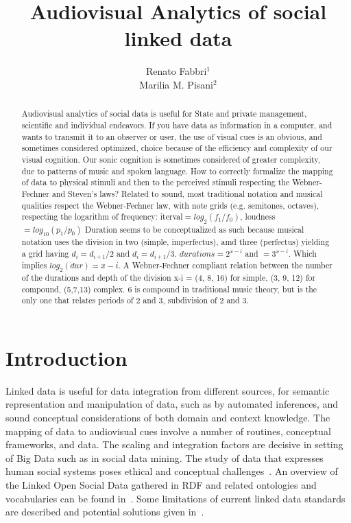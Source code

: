 \documentclass[letterpaper,10pt]{article}
\begin{document}
\title{Audiovisual Analytics of social linked data}

\author{Renato Fabbri$^1$\\
	Marilia M. Pisani$^2$
}
\address{$^1$IFSC/USP, $^2$CCNH/UFABC}

\begin{abstract}
	Audiovisual analytics of social data is useful for State and private
	management, scientific and individual endeavors.
	If you have data as information in a computer, and wants to
	transmit it to an observer or user, the use of visual cues is an obvious,
	and sometimes considered optimized, choice because of the efficiency and
	complexity of our visual cognition.
	Our sonic cognition is sometimes considered of greater complexity,
	due to patterns of music and spoken language.
	How to correctly formalize the mapping of data to physical stimuli
	and then to the perceived stimuli
	respecting the Webner-Fechner and Steven's laws?
	Related to sound, most traditional notation and musical qualities
	respect the Webner-Fechner law, with note grids (e.g. semitones, octaves),
	respecting the logarithm of frequency: iterval$=log_2(f_1/f_0)$,
	loudness$=log_10(p_1/p_0)$
	Duration seems to be conceptualized as such
	because musical notation uses the division in two (simple, imperfectus),
	amd three (perfectus) yielding a grid having
	$d_i=d_{i+1}/2$ and $d_i=d_{i+1}/3$.
	$durations=2^{x-i}$ and $=3^{x-i}$.
	Which implies $log_2(dur) = x-i$.
	A Webner-Fechner compliant relation
	between the number of the durations and
	depth of the division x-i = (4, 8, 16) for simple,
	(3, 9, 12) for compound,
	(5,7,13) complex.
	6 is compound in traditional music theory,
	but is the only one that relates periods of 2 and 3,
	subdivision of 2 and 3.
\end{abstract}

\section{Introduction}
Linked data is useful for data integration from different sources,
for semantic representation and manipulation of data,
such as by automated inferences,
and sound conceptual considerations of both domain and context
knowledge.
The mapping of data to audiovisual cues
involve a number of routines, conceptual frameworks,
and data.
The scaling and integration factors are decisive in setting
of Big Data such as in social data mining.
The study of data that expresses human social systems
poses ethical and conceptual challenges~\cite{an,an2}.
An overview of the Linked Open Social Data gathered
in RDF and related ontologies and vocabularies
can be found in~\cite{nuvem1,tese,losd}.
Some limitations of current linked data standards
are described and potential solutions given in~\cite{ont}.
\end{document}
